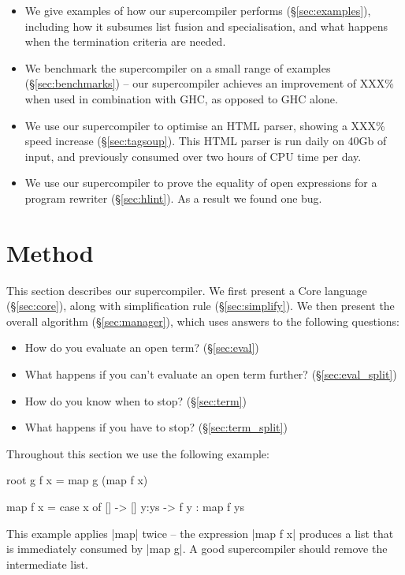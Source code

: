 \documentclass{sigplanconf}
\newcommand{\unknown}{XXX}
\begin{document}
\begin{itemize}
\item We give examples of how our supercompiler performs (\S\ref{sec:examples}), including how it subsumes list fusion and specialisation, and what happens when the termination criteria are needed.
\item We benchmark the supercompiler on a small range of examples (\S\ref{sec:benchmarks}) -- our supercompiler achieves an improvement of \unknown{}\% when used in combination with GHC, as opposed to GHC alone.
\item We use our supercompiler to optimise an HTML parser, showing a \unknown{}\% speed increase (\S\ref{sec:tagsoup}). This HTML parser is run daily on 40Gb of input, and previously consumed over two hours of CPU time per day.
\item We use our supercompiler to prove the equality of open expressions for a program rewriter (\S\ref{sec:hlint}). As a result we found one bug.
\end{itemize}

\section{Method}
\label{sec:method}

This section describes our supercompiler. We first present a Core language (\S\ref{sec:core}), along with simplification rule (\S\ref{sec:simplify}). We then present the overall algorithm (\S\ref{sec:manager}), which uses answers to the following questions:

\begin{itemize}
\item How do you evaluate an open term? (\S\ref{sec:eval})
\item What happens if you can't evaluate an open term further? (\S\ref{sec:eval_split})
\item How do you know when to stop? (\S\ref{sec:term})
\item What happens if you have to stop? (\S\ref{sec:term_split})
\end{itemize}

Throughout this section we use the following example:

\begin{code}
root g f x = map g (map f x)

map f x = case x of
    []    -> []
    y:ys  -> f y : map f ys
\end{code}

This example applies |map| twice -- the expression |map f x| produces a list that is immediately consumed by |map g|. A good supercompiler should remove the intermediate list.
\end{document}
